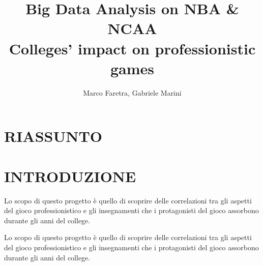 \documentclass[10pt,a4paper]{article}
\author{Marco Faretra, Gabriele Marini}
\title{\textbf{Big Data Analysis on NBA \& NCAA}\\Colleges' impact on professionistic games}
\begin{document}
	
\maketitle
\thispagestyle{empty}
\pagestyle{empty}
		
\section*{RIASSUNTO}

\section{INTRODUZIONE} 

Lo scopo di questo progetto è quello di scoprire delle correlazioni tra gli aspetti del gioco professionistico e gli insegnamenti che i protagonisti del gioco assorbono durante gli anni del college.

Lo scopo di questo progetto è quello di scoprire delle correlazioni tra gli aspetti del gioco professionistico e gli insegnamenti che i protagonisti del gioco assorbono durante gli anni del college.
\end{document}
